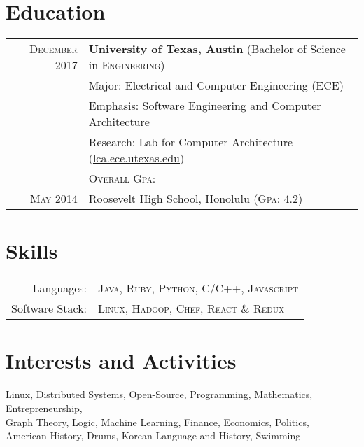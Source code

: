 \documentclass[a4paper,10pt]{article}
\begin{document}
\section{Education}
\begin{tabular}{rl}	

\textsc{December} 2017 
& \textbf{\color{medRed} University of Texas, Austin} (Bachelor of Science in \textsc{Engineering}) \\
& Major: Electrical and Computer Engineering (ECE) \\
& Emphasis: Software Engineering and Computer Architecture \\
& Research: Lab for Computer Architecture (\href{https://lca.ece.utexas.edu}{lca.ece.utexas.edu}) \\
&\normalsize \textsc{Overall Gpa}: \textbf{\color{red}{4.0}} \\[3mm]

\textsc{May} 2014 
& Roosevelt High School, Honolulu  (\textsc{Gpa}: 4.2)
\end{tabular}

\section{Skills}
\begin{tabular}{rl}
Languages:& \textsc{\color{medRed}Java}, \textsc{Ruby}, \textsc{Python}, \textsc{C/C++}, \textsc{Javascript} \\
  Software Stack:& \textsc{Linux}, \textsc{Hadoop}, \textsc{Chef}, \textsc{React \& Redux} \\
\end{tabular}

\section{Interests and Activities}
\small Linux, Distributed Systems, Open-Source, Programming, Mathematics, Entrepreneurship, \\
Graph Theory, Logic, Machine Learning, Finance, Economics, Politics, \\
American History, Drums, Korean Language and History, Swimming 

\end{document}
